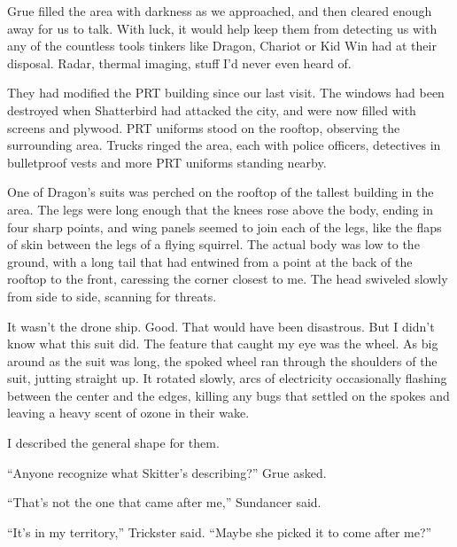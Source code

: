 \blacksquare



Grue filled the area with darkness as we approached, and then cleared enough away for us to talk.  With luck, it would help keep them from detecting us with any of the countless tools tinkers like Dragon, Chariot or Kid Win had at their disposal.  Radar, thermal imaging, stuff I'd never even heard of.



They had modified the PRT building since our last visit.  The windows had been destroyed when Shatterbird had attacked the city, and were now filled with screens and plywood.  PRT uniforms stood on the rooftop, observing the surrounding area.  Trucks ringed the area, each with police officers, detectives in bulletproof vests and more PRT uniforms standing nearby.



One of Dragon's suits was perched on the rooftop of the tallest building in the area.  The legs were long enough that the knees rose above the body, ending in four sharp points, and wing panels seemed to join each of the legs, like the flaps of skin between the legs of a flying squirrel.  The actual body was low to the ground, with a long tail that had entwined from a point at the back of the rooftop to the front, caressing the corner closest to me.  The head swiveled slowly from side to side, scanning for threats.



It wasn't the drone ship.  Good.  That would have been disastrous.  But I didn't know what this suit did.  The feature that caught my eye was the wheel.  As big around as the suit was long, the spoked wheel ran through the shoulders of the suit, jutting straight up.  It rotated slowly, arcs of electricity occasionally flashing between the center and the edges, killing any bugs that settled on the spokes and leaving a heavy scent of ozone in their wake.



I described the general shape for them.



``Anyone recognize what Skitter's describing?'' Grue asked.



``That's not the one that came after me,'' Sundancer said.



``It's in my territory,'' Trickster said.  ``Maybe she picked it to come after me?''



